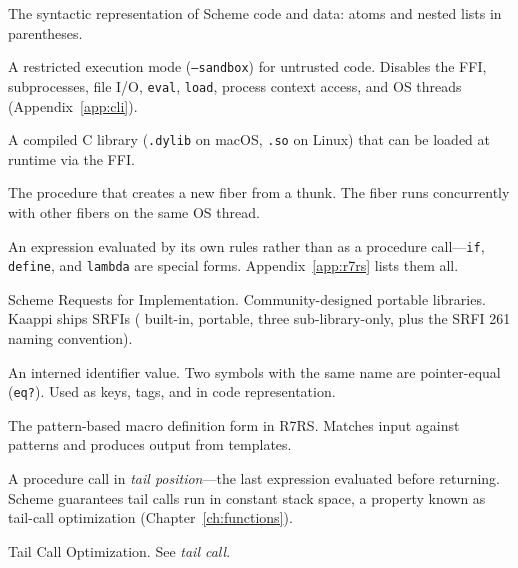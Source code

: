 \begin{description}[leftmargin=2em, style=nextline]
\item[S-expression]
The syntactic representation of Scheme code and data: atoms and nested lists in parentheses.

\item[sandbox]
A restricted execution mode (\texttt{--sandbox}) for untrusted code. Disables the FFI, subprocesses, file I/O, \texttt{eval}, \texttt{load}, process context access, and OS threads (Appendix~\ref{app:cli}).

\item[shared library]
A compiled C library (\texttt{.dylib} on macOS, \texttt{.so} on Linux) that can be loaded at runtime via the FFI.

\item[spawn]
The procedure that creates a new fiber from a thunk. The fiber runs concurrently with other fibers on the same OS thread.

\item[special form]
An expression evaluated by its own rules rather than as a procedure call---\texttt{if}, \texttt{define}, and \texttt{lambda} are special forms. Appendix~\ref{app:r7rs} lists them all.

\item[SRFI]
Scheme Requests for Implementation. Community-designed portable libraries. Kaappi ships \srfitotal{} SRFIs (\srfibuiltin{} built-in, \srfiportable{} portable, three sub-library-only, plus the SRFI 261 naming convention).

\item[symbol]
An interned identifier value. Two symbols with the same name are pointer-equal (\texttt{eq?}). Used as keys, tags, and in code representation.

\item[syntax-rules]
The pattern-based macro definition form in R7RS. Matches input against patterns and produces output from templates.

\item[tail call]
A procedure call in \emph{tail position}---the last expression evaluated before returning. Scheme guarantees tail calls run in constant stack space, a property known as tail-call optimization (Chapter~\ref{ch:functions}).

\item[TCO]
Tail Call Optimization. See \emph{tail call}.


\end{description}
